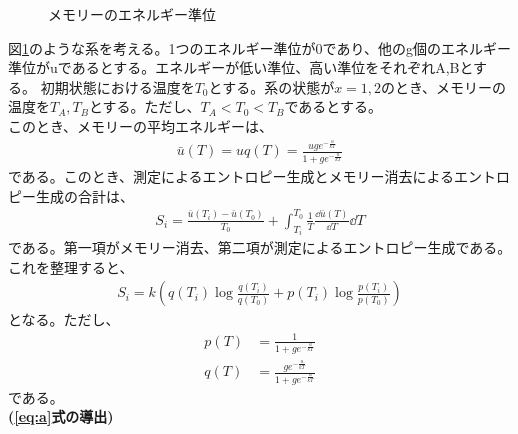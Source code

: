 \documentclass[a4paper,11pt]{jsarticle}
\numberwithin{equation}{section}
\begin{document}
\begin{figure}[H]
    \centering
{}
\caption{メモリーのエネルギー準位}
\label{fig:memory}
\end{figure}
図\ref{fig:memory}のような系を考える。1つのエネルギー準位が0であり、他のg個のエネルギー準位がuであるとする。エネルギーが低い準位、高い準位をそれぞれA,Bとする。
初期状態における温度を$T_0$とする。系の状態が$x =1,2$のとき、メモリーの温度を$T_A,T_B$とする。ただし、$T_A <T_0<T_B$であるとする。\\
このとき、メモリーの平均エネルギーは、
\begin{align}
    \bar{u}(T) = uq(T) = \frac{uge^{-\frac{u}{kT}}}{1+ge^{-\frac{u}{kT}}}
\end{align}
である。このとき、測定によるエントロピー生成とメモリー消去によるエントロピー生成の合計は、
\begin{align}
    S_i = \frac{\bar{u}(T_i)-\bar{u}(T_0)}{T_0} + \int_{T_i}^{T_0}\frac{1}{T}\frac{\dd \bar{u}(T)}{\dd T}\dd T
\end{align}
である。第一項がメモリー消去、第二項が測定によるエントロピー生成である。これを整理すると、%
\begin{align}
    S_i = k\left(q(T_i)\log\frac{q(T_i)}{q(T_0)} + p(T_i)\log\frac{p(T_i)}{p(T_0)}\right) \label{eq:a}
\end{align}
となる。ただし、
\begin{align}
    p(T) &= \frac{1}{1+ge^{-\frac{u}{kT}}} \\
    q(T) &= \frac{ge^{-\frac{u}{kT}}}{1+ge^{-\frac{u}{kT}}}
\end{align}
である。\\
\textbf{(\ref{eq:a}式の導出)}\\
\end{document}
